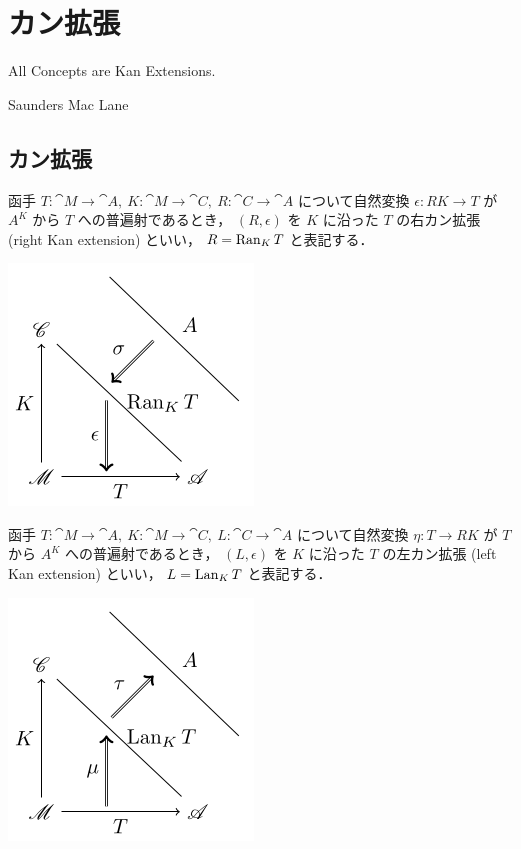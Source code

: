 \documentclass[titlepage]{ltjsreport}
\newtheorem[S]{theorem}{定理}[chapter]
\newtheorem[S]{definition}[theorem]{定義}
\newtheorem[S]{example}[theorem]{例}
\begin{document}
\chapter{カン拡張}

\epigraph{All Concepts are Kan Extensions.}{Saunders Mac Lane}

\section{カン拡張}

\begin{definition}[右カン拡張]
  函手
  $T:\cat{M}\to\cat{A},\ K:\cat{M}\to\cat{C},\ R:\cat{C}\to\cat{A}$
  について自然変換
  $\epsilon:RK\to T$
  が
  $A^K$
  から
  $T$
  への普遍射であるとき，
  $(R,\epsilon)$
  を
  $K$
  に沿った
  $T$
  の右カン拡張
  (right Kan extension)
  といい，
  $R=\operatorname{Ran}_{K}T$
  と表記する．
\end{definition}

\begin{center}
  \includegraphics{src/right-kan}
\end{center}

\begin{definition}[左カン拡張]
  函手
  $T:\cat{M}\to\cat{A},\ K:\cat{M}\to\cat{C},\ L:\cat{C}\to\cat{A}$
  について自然変換
  $\eta:T\to RK$
  が
  $T$
  から
  $A^K$
  への普遍射であるとき，
  $(L,\epsilon)$
  を
  $K$
  に沿った
  $T$
  の左カン拡張
  (left Kan extension)
  といい，
  $L=\operatorname{Lan}_{K}T$
  と表記する．
\end{definition}

\begin{center}
  \includegraphics{src/left-kan}
\end{center}
\end{document}
